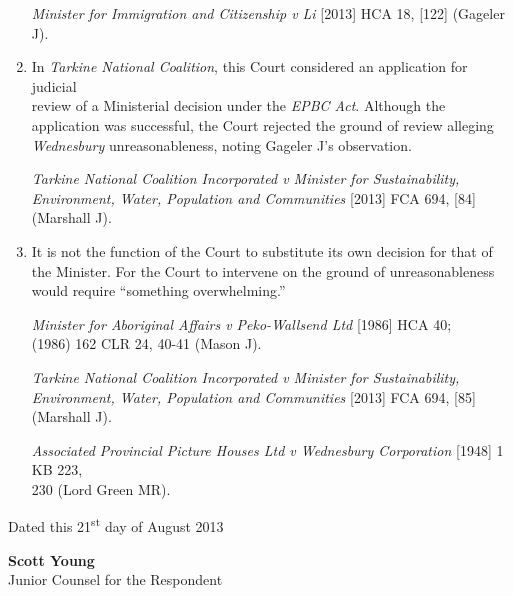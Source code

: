 \documentclass[12pt]{article}
\begin{document}
\begin{enumerate}[1.]
  \emph{Minister for Immigration and Citizenship v Li} {[}2013{]} HCA
  18, {[}122{]} (Gageler J).
\item
  In \emph{Tarkine National Coalition}, this Court considered an
  application for judicial\\ review of a Ministerial decision under the
  \emph{EPBC Act}. Although the application was successful, the Court
  rejected the ground of review alleging \emph{Wednesbury}
  unreasonableness, noting Gageler J's observation.

  \emph{Tarkine National Coalition Incorporated v Minister for
  Sustainability, Environment, Water, Population and Communities}
  {[}2013{]} FCA 694, {[}84{]} (Marshall J).
\item
  It is not the function of the Court to substitute its own decision for
  that of the Minister. For the Court to intervene on the ground of
  unreasonableness would require ``something overwhelming.''

  \emph{Minister for Aboriginal Affairs v Peko-Wallsend Ltd} {[}1986{]}
  HCA 40; \\(1986) 162 CLR 24, 40-41 (Mason J).

  \emph{Tarkine National Coalition Incorporated v Minister for
  Sustainability, Environment, Water, Population and Communities}
  {[}2013{]} FCA 694, {[}85{]} (Marshall J).

  \emph{Associated Provincial Picture Houses Ltd v Wednesbury
  Corporation} {[}1948{]} 1 KB 223, \\ 230 (Lord Green MR).
\end{enumerate}

\raggedleft
\vfill
Dated this 21\textsuperscript{st} day of August 2013

\vspace{48pt}

\textbf{Scott Young} \\Junior Counsel for the Respondent
\end{document}
